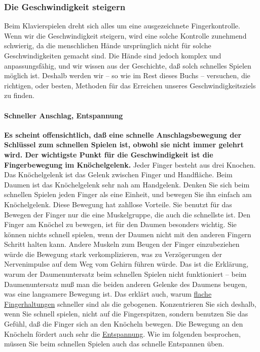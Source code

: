 
\subsubsection{Die Geschwindigkeit steigern}
\label{c1iii7i}

Beim Klavierspielen dreht sich alles um eine ausgezeichnete Fingerkontrolle.
Wenn wir die Geschwindigkeit steigern, wird eine solche Kontrolle zunehmend schwierig, da die menschlichen Hände ursprünglich nicht für solche Geschwindigkeiten gemacht sind.
Die Hände sind jedoch komplex und anpassungsfähig, und wir wissen aus der Geschichte, daß solch schnelles Spielen möglich ist.
Deshalb werden wir -- so wie im Rest dieses Buchs -- versuchen, die richtigen, oder besten, Methoden für das Erreichen  unseres Geschwindigkeitsziels zu finden.


\paragraph{Schneller Anschlag, Entspannung}
\label{c1iii7iAnschlag}

\textbf{Es scheint offensichtlich, daß eine schnelle Anschlagsbewegung der Schlüssel zum schnellen Spielen ist, obwohl sie nicht immer gelehrt wird.
Der wichtigste Punkt für die Geschwindigkeit ist die Fingerbewegung im Knöchelgelenk.}
Jeder Finger besteht aus drei Knochen.
Das Knöchelgelenk ist das Gelenk zwischen Finger und Handfläche.
Beim Daumen ist das Knöchelgelenk sehr nah am Handgelenk.
Denken Sie sich beim schnellen Spielen jeden Finger als eine Einheit, und bewegen Sie ihn einfach am Knöchelgelenk.
Diese Bewegung hat zahllose Vorteile.
Sie benutzt für das Bewegen der Finger nur die eine Muskelgruppe, die auch die schnellste ist.
Den Finger am Knöchel zu bewegen, ist für den Daumen besonders wichtig.
Sie können nichts schnell spielen, wenn der Daumen nicht mit den anderen Fingern Schritt halten kann.
Andere Muskeln zum Beugen der Finger einzubeziehen würde die Bewegung stark verkomplizieren, was zu Verzögerungen der Nervenimpulse auf dem Weg vom Gehirn führen würde.
Das ist die Erklärung, warum der Daumenuntersatz beim schnellen Spielen nicht funktioniert -- beim Daumenuntersatz muß man die beiden anderen Gelenke des Daumens beugen, was eine langsamere Bewegung ist.
Das erklärt auch, warum \hyperref[c1iii4b]{flache Fingerhaltungen} schneller sind als die gebogenen.
Konzentrieren Sie sich deshalb, wenn Sie schnell spielen, nicht auf die Fingerspitzen, sondern benutzen Sie das Gefühl, daß die Finger sich an den Knöcheln bewegen.
Die Bewegung an den Knöcheln fördert auch sehr die \hyperref[c1ii14]{Entspannung}.
Wie im folgenden besprochen, müssen Sie beim schnellen Spielen auch das schnelle Entspannen üben.

